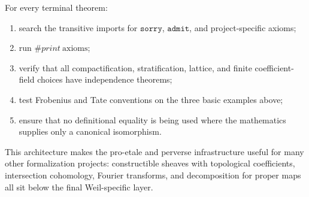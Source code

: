 For every terminal theorem:

\begin{enumerate}
\item search the transitive imports for \(\texttt{sorry}\),
      \(\texttt{admit}\), and project-specific axioms;
\item run \(\#print\ \mathrm{axioms}\);
\item verify that all compactification, stratification, lattice, and finite
      coefficient-field choices have independence theorems;
\item test Frobenius and Tate conventions on the three basic examples above;
\item ensure that no definitional equality is being used where the
      mathematics supplies only a canonical isomorphism.
\end{enumerate}

This architecture makes the pro-etale and perverse infrastructure useful for
many other formalization projects: constructible sheaves with topological
coefficients, intersection cohomology, Fourier transforms, and decomposition
for proper maps all sit below the final Weil-specific layer.
